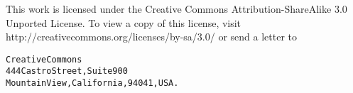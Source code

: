 This work is licensed under the Creative Commons 
Attribution-ShareAlike 3.0 Unported License.
To view a copy of this license, visit \\
http://creativecommons.org/licenses/by-sa/3.0/
or send a letter to

\begin{alltt}
Creative Commons\\
444 Castro Street, Suite 900\\
Mountain View, California, 94041, USA.
\end{alltt}
